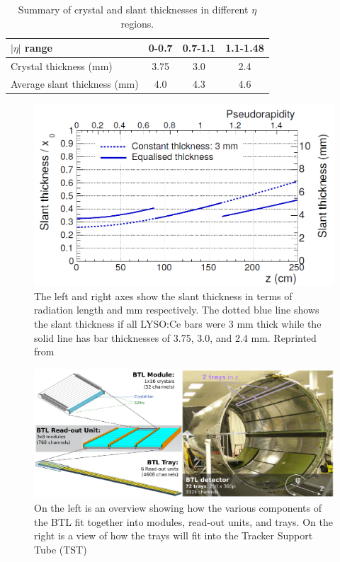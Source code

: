  \begin{table}[h]
 	\centering
 	\begin{tabular}{|l|c|c|c|}
 		\hline 
 		$|\eta|$ range & 0-0.7 & 0.7-1.1 & 1.1-1.48  \\ 
 		\hline 
 		Crystal thickness (mm) & 3.75 & 3.0 & 2.4 \\
 		\hline
 		Average slant thickness (mm) & 4.0 & 4.3 & 4.6 \\
 		\hline
 	\end{tabular} 
 	\caption{Summary of crystal and slant thicknesses in different $\eta$ regions.}
 	\label{table:slantthickness}
 \end{table}
 
 \begin{figure}[h]
 	\centering
 	\includegraphics[width=1.0\linewidth]{Figures/crystalslantthickness}
 	\caption[LYSO:Ce crystal slant thickness in the BTL.]{The left and right axes show the slant thickness in terms of radiation length and mm respectively. The dotted blue line shows the slant thickness if all LYSO:Ce bars were 3 mm thick while the solid line has bar thicknesses of 3.75, 3.0, and 2.4 mm. Reprinted from}
 	\label{fig:crystalslantthickness}
 \end{figure}
 
 
 
 \begin{figure}[h]
 	\centering
 	\includegraphics[width=1.0\linewidth]{Figures/BTL_overview}
 	\caption[Overview of the BTL]{On the left is an overview showing how the various components of the BTL fit together into modules, read-out units, and trays.  On the right is a view of how the trays will fit into the Tracker Support Tube (TST)}
 	\label{fig:btloverview}
 \end{figure}
 

